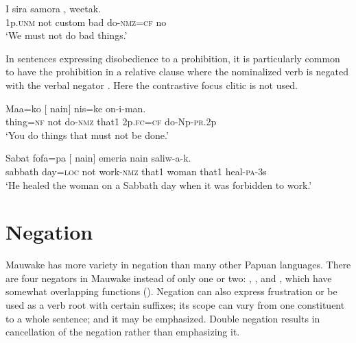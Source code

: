 \ea%
\label{ex:x1078}
\gll I    sira  samora  , weetak.\\
1p.\textsc{unm}  not  custom  bad  do-\textsc{nmz}=\textsc{cf}  no\\
\glt `We must not do bad things.'
\z

In sentences expressing disobedience to a prohibition, it is particularly common to have the prohibition in a relative clause where the nominalized verb is negated with the verbal negator . Here the contrastive focus clitic is not used. 

\ea%
\label{ex:x1887}
\gll Maa=ko  [    nain]  nis=ke  on-i-man. \\
thing=\textsc{nf}  not  do-\textsc{nmz}  that1  2p.\textsc{fc}=\textsc{cf}  do-Np-\textsc{pr}.2p\\
\glt `You do things that must not be done.'
\z

\ea%
\label{ex:x1888}
\gll Sabat  fofa=pa  [    nain]  emeria  nain  saliw-a-k. \\
sabbath  day=\textsc{loc}  not  work-\textsc{nmz}  that1  woman  that1  heal-\textsc{pa}-3s\\
\glt `He healed the woman on a Sabbath day when it was forbidden to work.'
\z

\section{Negation}\footnotemark{}
{}
Mauwake has more variety in negation than many other Papuan languages.
There are four negators in Mauwake instead of only one or two: , ,  and , which have somewhat overlapping functions (). Negation can also express frustration or be used as a verb root with certain suffixes; its scope can vary from one constituent to a whole sentence; and it may be emphasized. Double negation results in cancellation of the negation rather than emphasizing it. 

